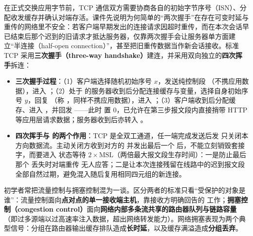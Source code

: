 
在正式交换应用字节前，TCP 通信双方需要协商各自的初始字节序号（ISN）、分配收发缓存并确认对端存活。课件先说明为何简单的“两次握手”在存在可变时延与重传的网络里不安全：若客户端早期发出的连接请求因超时重传，而在本次会话早已结束后那个迟到的旧请求才抵达服务器，仅靠两次握手会让服务器单方面建立“半连接（half-open connection）”，甚至把旧重传数据当作新会话接收。标准 TCP 采用\textbf{三次握手（three-way handshake）}建连，并采用双向独立的\textbf{四次挥手}拆连：


\begin{itemize}
\item \textbf{三次握手过程}：（1）客户端选择随机初始序号 $x$，发送纯控制段 （不携应用数据），进入 ；（2）处于  的服务器收到后分配连接缓存与变量，选择自身初始序号 $y$，回复 （称 ，同样不携应用数据），进入 ；（3）客户端收到后分配缓存、进入 ，并回发 ——此时  置 0，已允许在第三步报文段内直接捎带 HTTP  等应用层请求数据；服务器收到后亦转入 。
\item \textbf{四次挥手与  的两个作用}：TCP 是全双工通道，任一端完成发送后发  只关闭本方向数据流。主动关闭方收到对方的  并发出最后一个  后，不能立刻销毁套接字，而要进入  状态等待 $2\times\mathrm{MSL}$（两倍最大报文段生存时间）：一是防止最后那个  丢失时对端重传  无人应答；二是让本次连接残留在线路中的迟到报文段全部自然过期，避免混入随后复用相同四元组的新连接。
\end{itemize}



初学者常把流量控制与拥塞控制混为一谈。区分两者的标准只看“受保护的对象是谁”：流量控制面向\textbf{点对点的单一接收端主机}，靠接收方明确回告的  工作；\textbf{拥塞控制（congestion control）}面向\textbf{网络内部多条流共享的路由器队列与链路容量}（即过多源端以过高速率注入数据，超出网络转发能力）。网络拥塞表现为两个典型信号：分组在路由器输出缓存排队造成\textbf{长时延}，以及缓存满溢造成\textbf{分组丢弃}。

